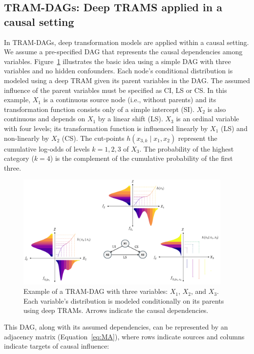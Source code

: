 \subsection{TRAM-DAGs: Deep TRAMS applied in a causal setting} \label{sec:tram_dags}



In TRAM-DAGs, deep transformation models are applied within a causal setting. We assume a pre-specified DAG that represents the causal dependencies among variables. 
Figure~\ref{fig:tram_dag} illustrates the basic idea using a simple DAG with three variables and no hidden confounders. Each node's conditional distribution is modeled using a deep TRAM given its parent variables in the DAG. The assumed influence of the parent variables must be specified as CI, LS or CS. In this example, $X_1$ is a continuous source node (i.e., without parents) and its transformation function consists only of a simple intercept (SI). $X_2$ is also continuous and depends on $X_1$ by a linear shift (LS). $X_3$ is an ordinal variable with four levels; its transformation function is influenced linearly by $X_1$ (LS) and non-linearly by $X_2$ (CS). The cut-points $h(x_{3,k} \mid x_1, x_2)$ represent the cumulative log-odds of levels $k = 1, 2, 3$ of $X_3$. The probability of the highest category ($k = 4$) is the complement of the cumulative probability of the first three.


\begin{figure}[H]
\centering
\includegraphics[width=0.95\textwidth]{img/tram_dag.png}
\caption{Example of a TRAM-DAG with three variables: $X_1$, $X_2$, and $X_3$. Each variable's distribution is modeled conditionally on its parents using deep TRAMs. Arrows indicate the causal dependencies.}
\label{fig:tram_dag}
\end{figure}

This DAG, along with its assumed dependencies, can be represented by an adjacency matrix (Equation~\ref{eq:MA}), where rows indicate sources and columns indicate targets of causal influence:



